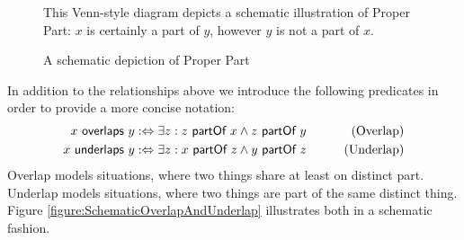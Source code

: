 \begin{figure}[h!]
\begin{center}
\end{center}
{
\scriptsize 
This Venn-style diagram depicts a schematic illustration of Proper Part:
$x$ is certainly a part of $y$, however $y$ is not a part of $x$.
}
\caption{A schematic depiction of Proper Part}
\label{figure:SchematicProperPart}
\end{figure}


In addition to the relationships above we introduce the following predicates in order to provide a more concise notation:
\begin{align}
x ~\textsf{overlaps}~ y
&:\Leftrightarrow
\exists z : z ~\textsf{partOf}~ x \wedge z ~\textsf{partOf}~ y
&\qquad \text{(Overlap)}
\label{definition:Overlap}
\\
x ~\textsf{underlaps}~ y
&:\Leftrightarrow
\exists z : x ~\textsf{partOf}~ z \wedge y ~\textsf{partOf}~ z
&\qquad \text{(Underlap)}
\label{definition:Underlap}
\end{align}
Overlap models situations, where two things share at least on distinct part.
Underlap models situations, where two things are part of the same distinct thing.
Figure \ref{figure:SchematicOverlapAndUnderlap} illustrates both in a schematic fashion.

